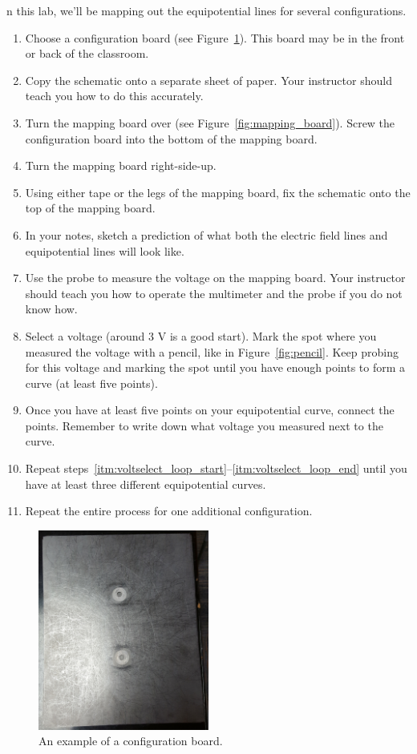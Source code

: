 \documentclass{article}
\begin{document}
	n this lab, we'll be mapping out the equipotential lines for several configurations.
	\begin{enumerate}
		\item{Choose a configuration board (see Figure~\ref{fig:config_board}). This board may be in the front or back of the classroom.}
		\item{Copy the schematic onto a separate sheet of paper. Your instructor should teach you how to do this accurately.}
		\item{Turn the mapping board over (see Figure~\ref{fig:mapping_board}). Screw the configuration board into the bottom of the mapping board.}
		\item{Turn the mapping board right-side-up.}
		\item{Using either tape or the legs of the mapping board, fix the schematic onto the top of the mapping board.}
		\item{In your notes, sketch a prediction of what both the electric field lines and equipotential lines will look like.}
		\item{Use the probe to measure the voltage on the mapping board. Your instructor should teach you how to operate the multimeter and the probe if you do not know how.}
		\item{Select a voltage (around 3 V is a good start). Mark the spot where you measured the voltage with a pencil, like in Figure~\ref{fig:pencil}. Keep probing for this voltage and marking the spot until you have enough points to form a curve (at least five points).\label{itm:voltselect_loop_start}}
		\item{Once you have at least five points on your equipotential curve, connect the points. Remember to write down what voltage you measured next to the curve.\label{itm:voltselect_loop_end}}
		\item{Repeat steps~\ref{itm:voltselect_loop_start}--\ref{itm:voltselect_loop_end} until you have at least three different equipotential curves.}
		\item{Repeat the entire process for one additional configuration.}
	\end{enumerate}
	
	\begin{figure}[hbt!]
		\begin{center}
			\includegraphics[width=0.5\textwidth]{config_board}
			\caption{An example of a configuration board.}
			\label{fig:config_board}
		\end{center}
	\end{figure}
	
\end{document}
